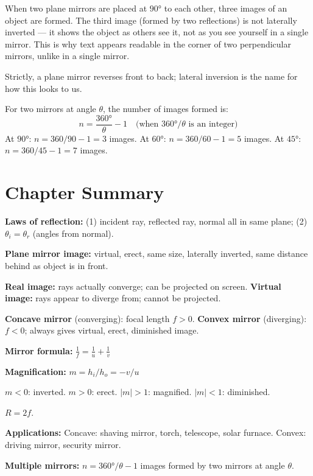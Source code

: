 \begin{processbox}
When two plane mirrors are placed at $90°$ to each
other, three images of an object are formed. The
third image (formed by two reflections) is not
laterally inverted --- it shows the object as others
see it, not as you see yourself in a single mirror.
This is why text appears readable in the corner of
two perpendicular mirrors, unlike in a single mirror.

Strictly, a plane mirror reverses front to back; lateral inversion
is the name for how this looks to us.

For two mirrors at angle $\theta$, the number of
images formed is:
\[
  n = \frac{360°}{\theta} - 1
  \quad \text{(when } 360°/\theta \text{ is an integer)}
\]
At $90°$: $n = 360/90 - 1 = 3$ images.
At $60°$: $n = 360/60 - 1 = 5$ images.
At $45°$: $n = 360/45 - 1 = 7$ images.
\end{processbox}

\section{Chapter Summary}

\begin{summarybox}
\textbf{Laws of reflection:} (1) incident ray,
reflected ray, normal all in same plane;
(2) $\theta_i = \theta_r$ (angles from normal).

\textbf{Plane mirror image:} virtual, erect, same size,
laterally inverted, same distance behind as object
is in front.

\textbf{Real image:} rays actually converge;
can be projected on screen.
\textbf{Virtual image:} rays appear to diverge from;
cannot be projected.

\textbf{Concave mirror} (converging): focal length $f > 0$.
\textbf{Convex mirror} (diverging): $f < 0$; always
gives virtual, erect, diminished image.

\textbf{Mirror formula:}
$\frac{1}{f} = \frac{1}{u} + \frac{1}{v}$

\textbf{Magnification:}
$m = h_i/h_o = -v/u$

$m < 0$: inverted. $m > 0$: erect.
$|m| > 1$: magnified. $|m| < 1$: diminished.

$R = 2f$.

\textbf{Applications:}
Concave: shaving mirror, torch, telescope, solar
furnace. Convex: driving mirror, security mirror.

\textbf{Multiple mirrors:}
$n = 360°/\theta - 1$ images formed by two mirrors
at angle $\theta$.
\end{summarybox}

